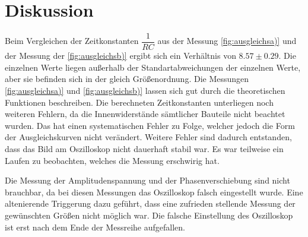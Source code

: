 \section{Diskussion}
\label{sec:Diskussion}


Beim Vergleichen der Zeitkonstanten $ \dfrac{1}{RC}$ aus der Messung \autoref{fig:ausgleichsa)} und der Messung der \autoref{fig:ausgleichsb)} ergibt sich ein Verhältnis von  $ 8.57 \pm 0.29$. 
Die einzelnen Werte liegen außerhalb der Standartabweichungen der einzelnen Werte, aber sie befinden sich in der gleich Größenordnung.
Die Messungen \autoref{fig:ausgleichsa)} und \autoref{fig:ausgleichsb)} lassen sich gut durch die theoretischen Funktionen beschreiben.
Die berechneten Zeitkonstanten unterliegen noch weiteren Fehlern, da die Innenwiderstände sämtlicher Bauteile nicht beachtet wurden. Das hat einen systematischen Fehler zu Folge, welcher jedoch die Form der Ausgleichskurven nicht verändert.
Weitere Fehler sind dadurch entstanden, dass das Bild am Oszilloskop nicht dauerhaft stabil war. Es war teilweise ein Laufen zu beobachten, welches die Messung erschwirig hat. 

Die Messung der Amplitudenspannung und der Phasenverschiebung sind nicht brauchbar, da bei diesen Messungen das Oszilloskop falsch eingestellt wurde. Eine altenierende Triggerung dazu geführt, dass eine zufrieden stellende Messung der gewünschten Größen nicht möglich war.
Die falsche Einstellung des Oszilloskop ist erst nach dem Ende der Messreihe aufgefallen.